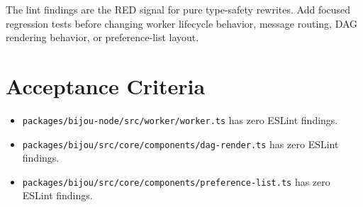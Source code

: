 The lint findings are the RED signal for pure type-safety rewrites. Add focused regression tests before changing worker lifecycle behavior, message routing, DAG rendering behavior, or preference-list layout.

\section{Acceptance Criteria}\label{record-218-acceptance-criteria}

\begin{itemize}
\tightlist
\item
  \texttt{p\allowbreak{}a\allowbreak{}c\allowbreak{}k\allowbreak{}a\allowbreak{}g\allowbreak{}e\allowbreak{}s\allowbreak{}/\allowbreak{}b\allowbreak{}i\allowbreak{}j\allowbreak{}o\allowbreak{}u\allowbreak{}-\allowbreak{}n\allowbreak{}o\allowbreak{}d\allowbreak{}e\allowbreak{}/\allowbreak{}s\allowbreak{}r\allowbreak{}c\allowbreak{}/\allowbreak{}w\allowbreak{}o\allowbreak{}r\allowbreak{}k\allowbreak{}e\allowbreak{}r\allowbreak{}/\allowbreak{}w\allowbreak{}o\allowbreak{}r\allowbreak{}k\allowbreak{}e\allowbreak{}r\allowbreak{}.\allowbreak{}t\allowbreak{}s} has zero ESLint findings.
\item
  \texttt{p\allowbreak{}a\allowbreak{}c\allowbreak{}k\allowbreak{}a\allowbreak{}g\allowbreak{}e\allowbreak{}s\allowbreak{}/\allowbreak{}b\allowbreak{}i\allowbreak{}j\allowbreak{}o\allowbreak{}u\allowbreak{}/\allowbreak{}s\allowbreak{}r\allowbreak{}c\allowbreak{}/\allowbreak{}c\allowbreak{}o\allowbreak{}r\allowbreak{}e\allowbreak{}/\allowbreak{}c\allowbreak{}o\allowbreak{}m\allowbreak{}p\allowbreak{}o\allowbreak{}n\allowbreak{}e\allowbreak{}n\allowbreak{}t\allowbreak{}s\allowbreak{}/\allowbreak{}d\allowbreak{}a\allowbreak{}g\allowbreak{}-\allowbreak{}r\allowbreak{}e\allowbreak{}n\allowbreak{}d\allowbreak{}e\allowbreak{}r\allowbreak{}.\allowbreak{}t\allowbreak{}s} has zero ESLint findings.
\item
  \texttt{p\allowbreak{}a\allowbreak{}c\allowbreak{}k\allowbreak{}a\allowbreak{}g\allowbreak{}e\allowbreak{}s\allowbreak{}/\allowbreak{}b\allowbreak{}i\allowbreak{}j\allowbreak{}o\allowbreak{}u\allowbreak{}/\allowbreak{}s\allowbreak{}r\allowbreak{}c\allowbreak{}/\allowbreak{}c\allowbreak{}o\allowbreak{}r\allowbreak{}e\allowbreak{}/\allowbreak{}c\allowbreak{}o\allowbreak{}m\allowbreak{}p\allowbreak{}o\allowbreak{}n\allowbreak{}e\allowbreak{}n\allowbreak{}t\allowbreak{}s\allowbreak{}/\allowbreak{}p\allowbreak{}r\allowbreak{}e\allowbreak{}f\allowbreak{}e\allowbreak{}r\allowbreak{}e\allowbreak{}n\allowbreak{}c\allowbreak{}e\allowbreak{}-\allowbreak{}l\allowbreak{}i\allowbreak{}s\allowbreak{}t\allowbreak{}.\allowbreak{}t\allowbreak{}s} has zero ESLint findings.

\end{itemize}
